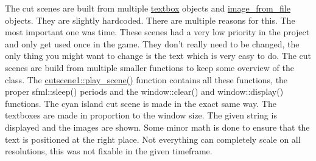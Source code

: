 The cut scenes are built from multiple \hyperlink{classtextbox}{textbox} objects and \hyperlink{classimage__from__file}{image\+\_\+from\+\_\+file} objects. They are slightly hardcoded. There are multiple reasons for this. The most important one was time. These scenes had a very low priority in the project and only get used once in the game. They don’t really need to be changed, the only thing you might want to change is the text which is very easy to do. The cut scenes are build from multiple smaller functions to keep some overview of the class. The \hyperlink{classcutscene1_af4c8e7ddc01274a70da482e1d7f56a14}{cutscene1\+::play\+\_\+scene()} function contains all these functions, the proper sfml\+::sleep() periods and the window\+::clear() and window\+::display() functions. The cyan island cut scene is made in the exact same way. The textboxes are made in proportion to the window size. The given string is displayed and the images are shown. Some minor math is done to ensure that the text is positioned at the right place. Not everything can completely scale on all resolutions, this was not fixable in the given timeframe. 